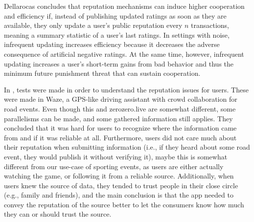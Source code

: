 Dellarocas \cite{Dellarocas2006-update-freq} concludes that reputation mechanisms can induce higher cooperation and efficiency if, instead of publishing updated ratings as soon as they are available, they only update a user's public reputation every $n$ transactions, meaning a summary statistic of a user's last ratings. In settings with noise, infrequent updating increases efficiency because it decreases the adverse consequence of artificial negative ratings. At the same time, however, infrequent updating increases a user's short-term gains from bad behavior and thus the minimum future punishment threat that can sustain cooperation.

In \cite{Afonso2016}, tests were made in order to understand the reputation issues for users. These were made in Waze, a GPS-like driving assistant with crowd collaboration for road events. Even though this and zerozero.live are somewhat different, some parallelisms can be made, and some gathered information still applies. They concluded that it was hard for users to recognize where the information came from and if it was reliable at all. Furthermore, users did not care much about their reputation when submitting information (i.e., if they heard about some road event, they would publish it without verifying it), maybe this is somewhat different from our use-case of sporting events, as users are either actually watching the game, or following it from a reliable source. Additionally, when users knew the source of data, they tended to trust people in their close circle (e.g., family and friends), and the main conclusion is that the app needed to convey the reputation of the source better to let the consumers know how much they can or should trust the source.

